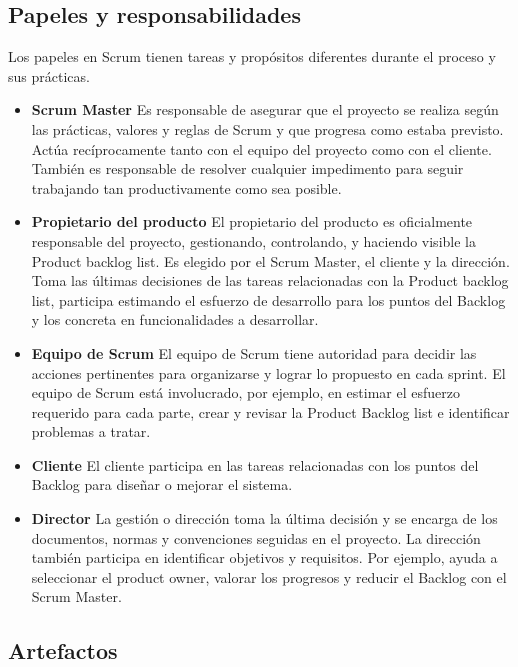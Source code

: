 \subsection{Papeles y responsabilidades}
Los papeles en Scrum tienen tareas y propósitos diferentes durante el proceso y sus prácticas.

\begin{itemize}
\item \textbf{Scrum Master} Es responsable de asegurar que el proyecto se realiza según las prácticas, valores y reglas de Scrum y que progresa como estaba previsto. Actúa recíprocamente tanto con el equipo del proyecto como con el cliente. También es responsable de resolver cualquier impedimento para seguir trabajando tan productivamente como sea posible. 

\item \textbf{Propietario del producto} El propietario del producto es oficialmente responsable del proyecto, gestionando, controlando, y haciendo visible la Product backlog list. Es elegido por el Scrum Master, el cliente y la dirección. Toma las últimas decisiones de las tareas relacionadas con la Product backlog list, participa estimando el esfuerzo de desarrollo para los puntos del Backlog y los concreta en funcionalidades a desarrollar.

\item \textbf{Equipo de Scrum} El equipo de Scrum tiene autoridad para decidir las acciones pertinentes para organizarse y lograr lo propuesto en cada sprint. El equipo de Scrum está involucrado, por ejemplo, en estimar el esfuerzo requerido para cada parte, crear y revisar la Product Backlog list e identificar problemas a tratar.

\item \textbf{Cliente} El cliente participa en las tareas relacionadas con los puntos del Backlog para diseñar o mejorar el sistema.

\item \textbf{Director} La gestión o dirección toma la última decisión y se encarga de los documentos, normas y convenciones seguidas en el proyecto. La dirección también participa en identificar objetivos y requisitos. Por ejemplo, ayuda a seleccionar el product owner, valorar los progresos y reducir el Backlog con el Scrum Master.
\end{itemize}

\subsection{Artefactos}
